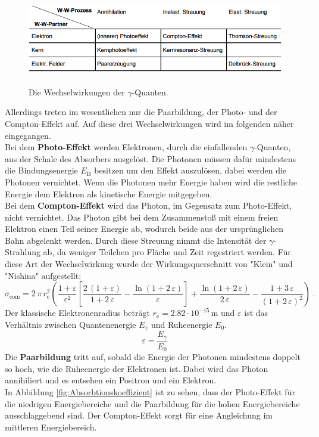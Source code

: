 \begin{figure}[H]
	\centering
	\includegraphics[height=4cm]{picture/Wechselwirkungen.PNG}
	\caption{Die Wechselwirkungen der $\gamma$-Quanten. \cite[4]{sample}}
	\label{fig:Wechselwirkungen}
\end{figure}

Allerdings treten im wesentlichen nur die Paarbildung, der Photo- und der Compton-Effekt auf. Auf diese drei Wechselwirkungen wird im folgenden näher eingegangen. \\
Bei dem \textbf{Photo-Effekt} werden Elektronen, durch die einfallenden $\gamma$-Quanten, aus der Schale des Absorbers ausgelöst. Die Photonen müssen dafür mindestens die Bindungsenergie $E_\text{B}$ besitzen um den Effekt auszulösen, dabei werden die Photonen vernichtet. Wenn die Photonen mehr Energie haben wird die restliche Energie dem Elektron als kinetische Energie mitgegeben. \\
Bei dem \textbf{Compton-Effekt} wird das Photon, im Gegensatz zum Photo-Effekt, nicht vernichtet. Das Photon gibt bei dem Zusammenstoß mit einem freien Elektron einen Teil seiner Energie ab, wodurch beide aus der ursprünglichen Bahn abgelenkt werden. Durch diese Streuung nimmt die Intensität der $\gamma$-Strahlung ab, da weniger Teilchen pro Fläche und Zeit regestriert werden. Für diese Art der Wechselwirkung wurde der Wirkungsquerschnitt von "Klein" und "Nishina" aufgestellt:
\begin{equation}
	\sigma_\text{com} = 2\,\pi\,r^2_\text{e} \left( \frac{1+\varepsilon}{\varepsilon^2} \left[\frac{2\,(1+\varepsilon)}{1+2\,\varepsilon} - \frac{\ln(1+2\,\varepsilon)}{\varepsilon} \right] + \frac{\ln(1+2\,\varepsilon)}{2\,\varepsilon} - \frac{1+3\,\varepsilon}{(1+2\,\varepsilon)^2} \right) \ .
	\label{eqn:Sigma}
\end{equation}
Der klassische Elektronenradius beträgt $r_\text{e} = 2.82 \cdot 10^{-15}$\,m und $\varepsilon$ ist das Verhältnis zwischen Quantenenergie $E_\gamma$ und Ruheenergie $E_0$.
\begin{equation}
	\varepsilon = \frac{E_\gamma}{E_0}
	\label{eqn:VarE}
\end{equation}
Die \textbf{Paarbildung} tritt auf, sobald die Energie der Photonen mindestens doppelt so hoch, wie die Ruheenergie der Elektronen ist. Dabei wird das Photon annihiliert und es entsehen ein Positron und ein Elektron. \\
In Abbildung \eqref{fig:Absorbtionskoeffizient} ist zu sehen, dass der Photo-Effekt für die niedrigen Energiebereiche und die Paarbildung für die hohen Energiebereiche ausschlaggebend sind. Der Compton-Effekt sorgt für eine Angleichung im mittleren Energiebereich.

